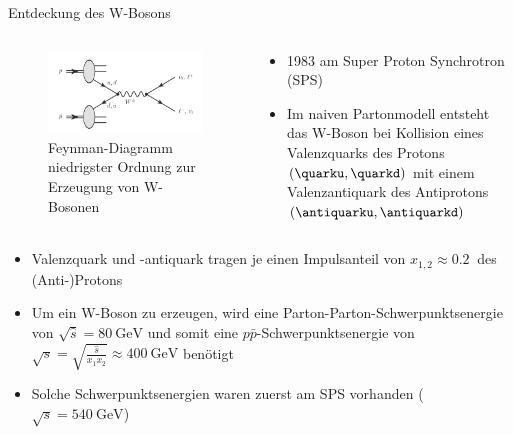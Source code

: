 \documentclass[aspectratio=1610, 9pt]{beamer}
\begin{document}
\begin{frame}{Entdeckung des W-Bosons}
  \begin{columns}
    \begin{column}{0.4\textwidth}
      \begin{figure}
        \includegraphics[width=\textwidth]{images/feynman.png}
        \caption{Feynman-Diagramm niedrigster Ordnung zur Erzeugung von W-Bosonen \cite{skript}}
        \label{fig:feynman}
      \end{figure}
    \end{column}
    \begin{column}{0.4\textwidth}
      \begin{itemize}
        \item 1983 am Super Proton Synchrotron (SPS)
        \item Im naiven Partonmodell entsteht das W-Boson bei Kollision eines Valenzquarks des Protons $(\quarku, \quarkd)$ mit einem Valenzantiquark des Antiprotons $(\antiquarku, \antiquarkd)$
      \end{itemize}
    \end{column}
  \end{columns}
\end{frame}

\begin{frame}
  \begin{itemize}
    \item Valenzquark und -antiquark tragen je einen Impulsanteil von $x_{1,2} \approx \SI{0,2}{}$ des (Anti-)Protons
    \item Um ein W-Boson zu erzeugen, wird eine Parton-Parton-Schwerpunktsenergie von $\sqrt{\hat{s}} = \SI{80}{\GeV}$ und somit eine $p \bar{p}$-Schwerpunktsenergie von $\sqrt{s} = \sqrt{\frac{\hat{s}}{x_1 x_2}} \approx \SI{400}{\GeV}$ benötigt
    \item Solche Schwerpunktsenergien waren zuerst am SPS vorhanden ($\sqrt{s} = \SI{540}{\GeV}$)
  \end{itemize}
\end{frame}
\end{document}
